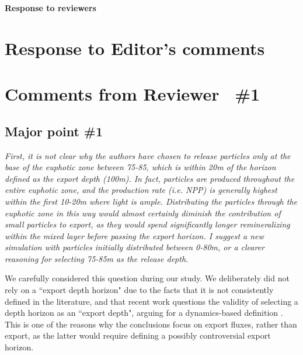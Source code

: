 \documentclass[12pt,letter]{article}
\begin{document}
\begin{center}
\large
\textbf{
Response to reviewers\\}
\end{center}
\small

\section{Response to Editor's comments}

\section{Comments from Reviewer  \#1}
\subsection*{Major point \#1}
\small
\textit{First, it is not clear why the authors have chosen to release particles only at the base of the euphotic zone between 75-85, which is within 20m of the horizon defined as the export depth (100m). In fact, particles are produced throughout the entire euphotic zone, and the production rate (i.e. NPP) is generally highest within the first 10-20m where light is ample. Distributing the particles through the euphotic zone in this way would almost certainly diminish the contribution of small particles to export, as they would spend significantly longer remineralizing within the mixed layer before passing the export horizon. I suggest a new simulation with particles initially distributed between 0-80m, or a clearer reasoning for selecting 75-85m as the release depth.\\}


We carefully considered this question during our study. We deliberately  did not rely on a ``export depth horizon" due to the facts that it is not consistently defined in the literature, and that recent work questions the validity of selecting a depth horizon as an ``export depth", arguing for a dynamics-based definition \citep{Palevsky_2018}. This is one of the reasons why the conclusions focus on export fluxes, rather than export, as the latter would require defining a possibly controversial export horizon.\\
			
\end{document}
